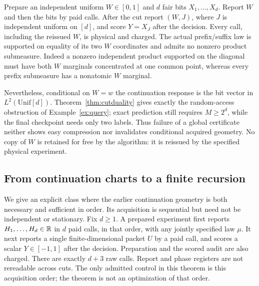 \begin{example}\label{ex:diagonal}
Prepare an independent uniform $W\in[0,1]$ and $d$ fair bits $X_1,\ldots,X_d$. Report $W$ and then the bits by paid calls. After the cut report $(W,J)$, where $J$ is independent uniform on $[d]$, and score $Y=X_J$ after the decision. Every call, including the reissued $W$, is physical and charged. The actual prefix/suffix law is supported on equality of its two $W$ coordinates and admits no nonzero product submeasure. Indeed a nonzero independent product supported on the diagonal must have both $W$ marginals concentrated at one common point, whereas every prefix submeasure has a nonatomic $W$ marginal.

Nevertheless, conditional on $W=w$ the continuation response is the bit vector in $L^2(\mathrm{Unif}[d])$. Theorem~\ref{thm:cutduality} gives exactly the random-access obstruction of Example~\ref{ex:query}; exact prediction still requires $M\ge2^d$, while the final checkpoint needs only two labels. Thus failure of a global certificate neither shows easy compression nor invalidates conditional acquired geometry. No copy of $W$ is retained for free by the algorithm: it is reissued by the specified physical experiment.
\end{example}

\subsection{From continuation charts to a finite recursion}
We give an explicit class where the earlier continuation geometry is both necessary and sufficient in order. Its acquisition is sequential but need not be independent or stationary. Fix $d\ge1$. A prepared experiment first reports $H_1,\ldots,H_d\in\mathbb R$ in $d$ paid calls, in that order, with any jointly specified law $\mu$. It next reports a single finite-dimensional packet $U$ by a paid call, and scores a scalar $Y\in[-1,1]$ after the decision. Preparation and the scored audit are also charged. There are exactly $d+3$ raw calls. Report and phase registers are not rereadable across cuts. The only admitted control in this theorem is this acquisition order; the theorem is not an optimization of that order.

